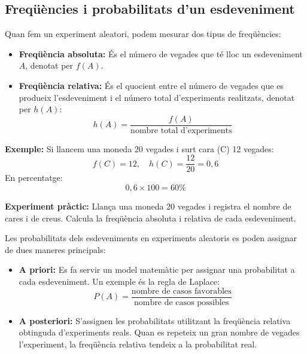 \documentclass[12pt]{article}
\begin{document}
\subsection*{Freqüències i probabilitats d'un esdeveniment}

\begin{concept} [title=Freqüència absoluta i relativa] \noindent Quan fem un experiment aleatori, podem mesurar dos tipus de freqüències:  
\begin{itemize}
    \item \textbf{Freqüència absoluta:} És el número de vegades que té lloc un esdeveniment $A$, denotat per $f(A)$.
    \item \textbf{Freqüència relativa:} És el quocient entre el número de vegades que es produeix l'esdeveniment i el número total d'experiments realitzats, denotat per $h(A)$:
    \[
    h(A) = \frac{f(A)}{\text{nombre total d'experiments}}
    \]
\end{itemize}
\textbf{Exemple:}  
Si llancem una moneda 20 vegades i surt cara (C) 12 vegades:  
\[
f(C) = 12, \quad h(C) = \frac{12}{20} = 0,6
\]
En percentatge:  
\[
0,6 \times 100 = 60\%
\]
\end{concept}

\begin{exercici} \noindent 
\textbf{Experiment pràctic:}  
Llança una moneda 20 vegades i registra el nombre de cares i de creus. Calcula la freqüència absoluta i relativa de cada esdeveniment.
\end{exercici}

\begin{concept} [title=Assignació de probabilitats als esdeveniments] \noindent Les probabilitats dels esdeveniments en experiments aleatoris es poden assignar de dues maneres principals:  
\begin{itemize}
    \item \textbf{A priori:} Es fa servir un model matemàtic per assignar una probabilitat a cada esdeveniment. Un exemple és la regla de Laplace:  
    \[
    P(A) = \frac{\text{nombre de casos favorables}}{\text{nombre de casos possibles}}
    \]
    \item \textbf{A posteriori:} S'assignen les probabilitats utilitzant la freqüència relativa obtinguda d'experiments reals. Quan es repeteix un gran nombre de vegades l'experiment, la freqüència relativa tendeix a la probabilitat real.
\end{itemize}
\end{concept}
\end{document}
